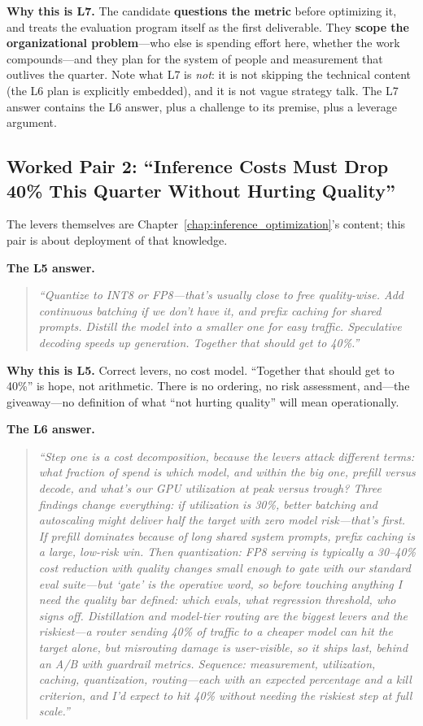 \textbf{Why this is L7.} The candidate \textbf{questions the metric} before optimizing it, and treats the evaluation program itself as the first deliverable. They \textbf{scope the organizational problem}---who else is spending effort here, whether the work compounds---and they plan for the system of people and measurement that outlives the quarter. Note what L7 is \textit{not}: it is not skipping the technical content (the L6 plan is explicitly embedded), and it is not vague strategy talk. The L7 answer contains the L6 answer, plus a challenge to its premise, plus a leverage argument.

\subsection{Worked Pair 2: ``Inference Costs Must Drop 40\% This Quarter Without Hurting Quality''}

The levers themselves are Chapter~\ref{chap:inference_optimization}'s content; this pair is about deployment of that knowledge.

\textbf{The L5 answer.}
\begin{quote}\itshape
``Quantize to INT8 or FP8---that's usually close to free quality-wise. Add continuous batching if we don't have it, and prefix caching for shared prompts. Distill the model into a smaller one for easy traffic. Speculative decoding speeds up generation. Together that should get to 40\%.''
\end{quote}

\textbf{Why this is L5.} Correct levers, no cost model. ``Together that should get to 40\%'' is hope, not arithmetic. There is no ordering, no risk assessment, and---the giveaway---no definition of what ``not hurting quality'' will mean operationally.

\textbf{The L6 answer.}
\begin{quote}\itshape
``Step one is a cost decomposition, because the levers attack different terms: what fraction of spend is which model, and within the big one, prefill versus decode, and what's our GPU utilization at peak versus trough? Three findings change everything: if utilization is 30\%, better batching and autoscaling might deliver half the target with zero model risk---that's first. If prefill dominates because of long shared system prompts, prefix caching is a large, low-risk win. Then quantization: FP8 serving is typically a 30--40\% cost reduction with quality changes small enough to gate with our standard eval suite---but `gate' is the operative word, so before touching anything I need the quality bar defined: which evals, what regression threshold, who signs off. Distillation and model-tier routing are the biggest levers and the riskiest---a router sending 40\% of traffic to a cheaper model can hit the target alone, but misrouting damage is user-visible, so it ships last, behind an A/B with guardrail metrics. Sequence: measurement, utilization, caching, quantization, routing---each with an expected percentage and a kill criterion, and I'd expect to hit 40\% without needing the riskiest step at full scale.''
\end{quote}

